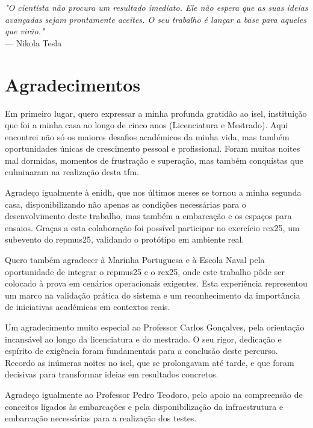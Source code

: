 \newpage
\vspace*{\fill}
\begin{flushright}
\textit{"O cientista não procura um resultado imediato. Ele não espera que as suas ideias avançadas sejam prontamente aceites. O seu trabalho é lançar a base para aqueles que virão."} \\
--- Nikola Tesla
\end{flushright}
\vspace*{\fill}

\chapter{Agradecimentos}

Em primeiro lugar, quero expressar a minha profunda gratidão ao \acrfull{isel}, instituição que foi a minha casa ao longo de cinco anos (Licenciatura e Mestrado). Aqui encontrei não só os maiores desafios académicos da minha vida, mas também oportunidades únicas de crescimento pessoal e profissional. Foram muitas noites mal dormidas, momentos de frustração e superação, mas também conquistas que culminaram na realização desta \gls{tfm}.  

Agradeço igualmente à \acrfull{enidh}, que nos últimos meses se tornou a minha segunda casa, disponibilizando não apenas as condições necessárias para o desenvolvimento deste trabalho, mas também a embarcação e os espaços para ensaios. Graças a esta colaboração foi possível participar no exercício \gls{rex25}, um subevento do \gls{repmus25}, validando o protótipo em ambiente real.  

Quero também agradecer à Marinha Portuguesa e à Escola Naval pela oportunidade de integrar o \gls{repmus25} e o \gls{rex25}, onde este trabalho pôde ser colocado à prova em cenários operacionais exigentes. Esta experiência representou um marco na validação prática do sistema e um reconhecimento da importância de iniciativas académicas em contextos reais.  

Um agradecimento muito especial ao Professor Carlos Gonçalves, pela orientação incansável ao longo da licenciatura e do mestrado. O seu rigor, dedicação e espírito de exigência foram fundamentais para a conclusão deste percurso. Recordo as inúmeras noites no \gls{isel}, que se prolongavam até tarde, e que foram decisivas para transformar ideias em resultados concretos.  

Agradeço igualmente ao Professor Pedro Teodoro, pelo apoio na compreensão de conceitos ligados às embarcações e pela disponibilização da infraestrutura e embarcação necessárias para a realização dos testes.  

